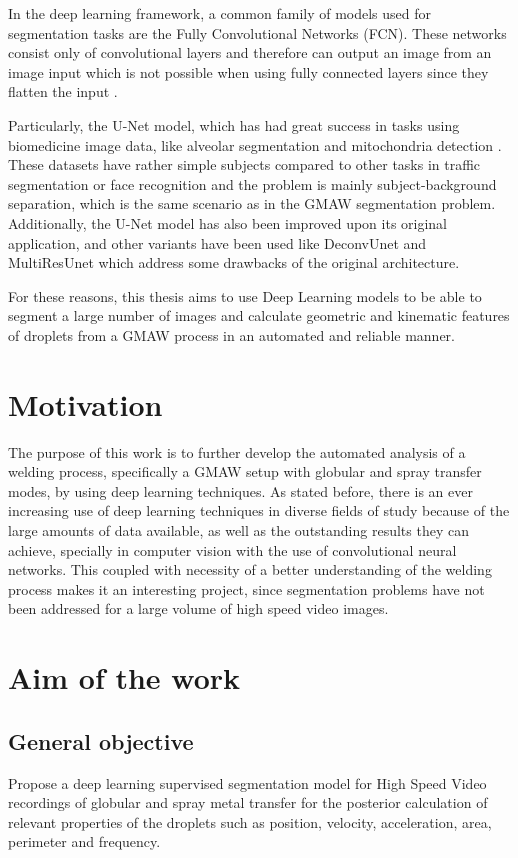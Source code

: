 \begin{intro}
In the deep learning framework, a common family of models used for segmentation tasks are the Fully Convolutional Networks (FCN). These networks consist only of convolutional layers and therefore can output an image from an image input which is not possible when using fully connected layers since they flatten the input \cite{segmentation-survey}. 

Particularly, the U-Net model, which has had great success in tasks using biomedicine image data, like alveolar segmentation and mitochondria detection \cite{Duong, Casser}. These datasets have rather simple subjects compared to other tasks in traffic segmentation or face recognition and the problem is mainly subject-background separation, which is the same scenario as in the GMAW segmentation problem. Additionally, the U-Net model has also been improved upon its original application, and other variants have been used like DeconvUnet and MultiResUnet \cite{Noh, Ibtehaz} which address some drawbacks of the original architecture.

For these reasons, this thesis aims to use Deep Learning models to be able to segment a large number of images and calculate geometric and kinematic features of droplets from a GMAW process in an automated and reliable manner.

\section{Motivation}

The purpose of this work is to further develop the automated analysis of a welding process, specifically a GMAW setup with globular and spray transfer modes, by using deep learning techniques. As stated before, there is an ever increasing use of deep learning techniques in diverse fields of study because of the large amounts of data available, as well as the outstanding results they can achieve, specially in computer vision with the use of convolutional neural networks. This coupled with necessity of a better understanding of the welding process makes it an interesting project, since segmentation problems have not been addressed for a large volume of high speed video images.

\section{Aim of the work}
\subsection{General objective}
Propose a deep learning supervised segmentation model for High Speed Video recordings of globular and spray metal transfer for the posterior calculation of relevant properties of the droplets such as position, velocity, acceleration, area, perimeter and frequency.


\end{intro}
